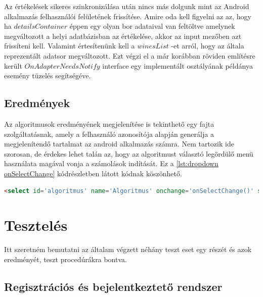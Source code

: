 \documentclass[12pt]{report}
\theoremstyle{definition}
\begin{document}
	Az értékelések sikeres szinkronizálása után nincs más dolgunk mint az Android alkalmazás felhasználói felületének frissítése. Amire oda kell figyelni az az, hogy ha \linebreak$detailsContainer$ éppen egy olyan bor adataival van feltöltve amelynek megváltozott a helyi adatbázisban az értékelése, akkor az input mezőben azt frissíteni kell. Valamint értesítenünk kell a $winesList$ -et arról, hogy az általa reprezentált adatsor megváltozott. Ezt végzi el a már korábban röviden említésre került $OnAdapterNeedsNotify$ interface egy implementált osztályának példánya esemény tüzelés segítségéve.
	
	\section{Eredmények}
	Az algoritmusok eredményének megjelenítése is tekinthető egy fajta szolgáltatásnak, amely a felhasználó azonosítója alapján generálja a megjelenítendő tartalmat az android alkalmazás számra. Nem tartozik ide szorosan, de érdekes lehet talán az, hogy az algoritmust választó legördülő menü használata magával vonja a számolások indítását. Ez a \ref{lst:dropdown onSelectChange} kódrészletben látott kódnak köszönhető.
	
	\noindent\begin{minipage}{\linewidth}
		\begin{lstlisting}[language=html,label={lst:dropdown onSelectChange}, caption={Legordülő menübeli algoritmus választás egyből indítja a számolást}]
<select id='algoritmus' name='Algoritmus' onchange='onSelectChange()' style="width: 100%;">
		\end{lstlisting}
	\end{minipage}
	
	
	\chapter{Tesztelés}
	Itt szeretném bemutatni az általam végzett néhány teszt eset egy részét és azok eredményét, teszt procedúrákra bontva.
	
	\setcounter{TP}{1}
	\setcounter{TC}{1}
	
	\section{Regisztrációs és bejelentkeztető rendszer}
	
\end{document}
